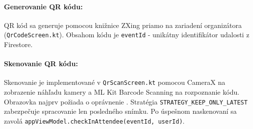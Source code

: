   \paragraph{Generovanie QR kódu:}
  QR kód sa generuje pomocou knižnice ZXing priamo na zariadení organizátora
  (\texttt{QrCodeScreen.kt}). Obsahom kódu je \texttt{eventId} - unikátny
  identifikátor udalosti z Firestore.

  \paragraph{Skenovanie QR kódu:}
  Skenovanie je implementované v \texttt{QrScanScreen.kt} pomocou CameraX
  na zobrazenie náhľadu kamery a ML Kit Barcode Scanning na rozpoznanie kódu.
  Obrazovka najprv požiada o oprávnenie . Stratégia
  \texttt{STRATEGY\_KEEP\_ONLY\_LATEST} zabezpečuje spracovanie len posledného
  snímku. Po úspešnom naskenovaní sa zavolá
  \texttt{appViewModel.checkInAttendee(eventId, userId)}.

